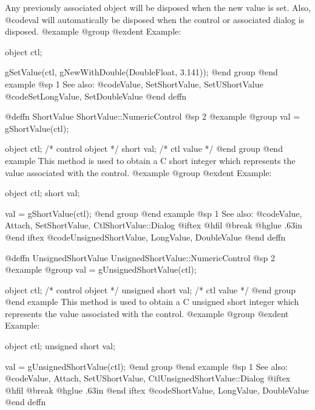 {Any previously associated object will be disposed when the new value is set.
Also, @code{val} will automatically be disposed when the control or associated
dialog is disposed.
@example
@group
@exdent Example:

object  ctl;

gSetValue(ctl, gNewWithDouble(DoubleFloat, 3.141));
@end group
@end example
@sp 1
See also:  @code{Value, SetShortValue, SetUShortValue}
        @code{SetLongValue, SetDoubleValue}
@end deffn











@deffn {ShortValue} ShortValue::NumericControl
@sp 2
@example
@group
val = gShortValue(ctl);

object  ctl;   /*  control object  */
short   val;   /*  ctl value       */
@end group
@end example
This method is used to obtain a C short integer which represents the
value associated with the control.  
@example
@group
@exdent Example:

object  ctl;
short   val;

val = gShortValue(ctl);
@end group
@end example
@sp 1
See also:  @code{Value, Attach, SetShortValue, CtlShortValue::Dialog}
@iftex
@hfil @break @hglue .63in 
@end iftex
@code{UnsignedShortValue, LongValue, DoubleValue}
@end deffn











@deffn {UnsignedShortValue} UnsignedShortValue::NumericControl
@sp 2
@example
@group
val = gUnsignedShortValue(ctl);

object  ctl;           /*  control object  */
unsigned short  val;   /*  ctl value       */
@end group
@end example
This method is used to obtain a C unsigned short integer which represents the
value associated with the control.  
@example
@group
@exdent Example:

object  ctl;
unsigned short  val;

val = gUnsignedShortValue(ctl);
@end group
@end example
@sp 1
See also:  @code{Value, Attach, SetUShortValue, CtlUnsignedShortValue::Dialog}
@iftex
@hfil @break @hglue .63in 
@end iftex
@code{ShortValue, LongValue, DoubleValue}
@end deffn










}
